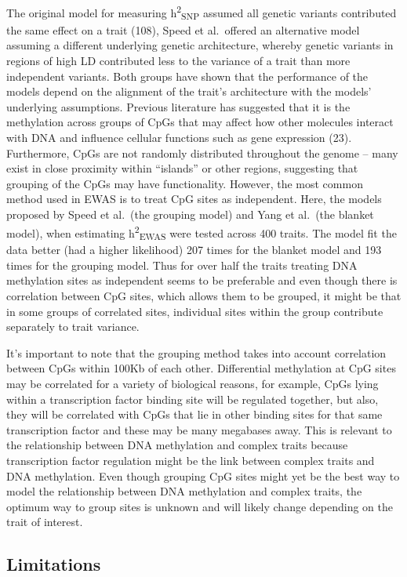 \documentclass[11pt,twoside]{bristolthesis}
\begin{document}
The original model for measuring h\textsuperscript{2}\textsubscript{SNP} assumed all genetic variants contributed the same effect on a trait (108), Speed et al.~offered an alternative model assuming a different underlying genetic architecture, whereby genetic variants in regions of high LD contributed less to the variance of a trait than more independent variants. Both groups have shown that the performance of the models depend on the alignment of the trait's architecture with the models' underlying assumptions. Previous literature has suggested that it is the methylation across groups of CpGs that may affect how other molecules interact with DNA and influence cellular functions such as gene expression (23). Furthermore, CpGs are not randomly distributed throughout the genome -- many exist in close proximity within ``islands'' or other regions, suggesting that grouping of the CpGs may have functionality. However, the most common method used in EWAS is to treat CpG sites as independent. Here, the models proposed by Speed et al.~(the grouping model) and Yang et al.~(the blanket model), when estimating h\textsuperscript{2}\textsubscript{EWAS} were tested across 400 traits. The model fit the data better (had a higher likelihood) 207 times for the blanket model and 193 times for the grouping model. Thus for over half the traits treating DNA methylation sites as independent seems to be preferable and even though there is correlation between CpG sites, which allows them to be grouped, it might be that in some groups of correlated sites, individual sites within the group contribute separately to trait variance.

It's important to note that the grouping method takes into account correlation between CpGs within 100Kb of each other. Differential methylation at CpG sites may be correlated for a variety of biological reasons, for example, CpGs lying within a transcription factor binding site will be regulated together, but also, they will be correlated with CpGs that lie in other binding sites for that same transcription factor and these may be many megabases away. This is relevant to the relationship between DNA methylation and complex traits because transcription factor regulation might be the link between complex traits and DNA methylation. Even though grouping CpG sites might yet be the best way to model the relationship between DNA methylation and complex traits, the optimum way to group sites is unknown and will likely change depending on the trait of interest.

\hypertarget{limitations-05}{%
\subsection{Limitations}\label{limitations-05}}
\end{document}
